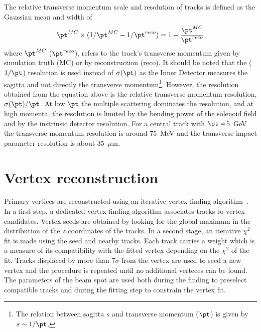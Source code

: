 The relative transverse momentum scale and resolution of tracks is defined as the Gaussian mean and width of
%
\begin{equation}
\pt^{MC} \times (1/\pt^{MC}  - 1/\pt^{reco}) = 1 - \frac{\pt^{MC}}{\pt^{reco}}
\end{equation}
%
where $\pt^{MC}$ ($\pt^{reco}$), refers to the track's transverse momentum given by simulation truth (MC) or by reconstruction (reco). It should be noted that the ($1/\pt$) resolution is used instead of $\sigma(\pt)$ as the Inner Detector measures the sagitta and not directly the transverse momentum\footnote{The relation between sagitta $s$ and transverse momentum ($\pt$) is given by $s \sim  1/\pt$. }.  However, the resolution obtained from the equation above is the relative transverse momentum resolution,  $\sigma(\pt) / \pt$. At low $\pt$ the multiple scattering dominates the resolution, and at high momenta, the resolution is limited by the bending power of the solenoid field and by the instrinsic detector resolution.  For a central track with $\pt=$5~GeV %
the transverse momentum resolution is around 75~MeV and the transverse impact parameter resolution is about 35~$\mu$m.



\section{Vertex reconstruction}\label{sec:trackreco}

Primary vertices are reconstructed using an iterative vertex finding algorithm~\cite{ATLAS-CONF-2010-069}. In a first step, a dedicated vertex finding algorithm associates tracks to vertex candidates. Vertex seeds are obtained by looking for the global maximum in the distribution of the $z$ coordinates of the tracks. In a second stage, an iterative $\chi^2$ fit is made using the seed and nearby tracks. Each track carries a weight which is a measure of its compatibility with the fitted vertex depending on the $\chi^2$ of the fit. Tracks displaced by more than 7$\sigma$ from the vertex are used to seed a new vertex and the procedure is repeated until no additional verteces can be found.  %
The parameters of the beam spot are used both during the finding to preselect compatible tracks and during the fitting step to constrain the vertex fit.


